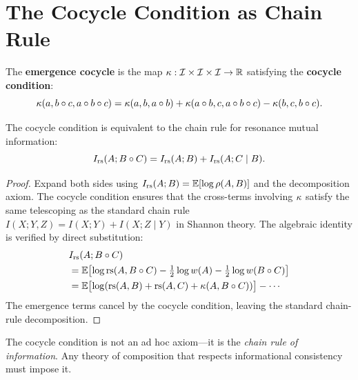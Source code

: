 \section{The Cocycle Condition as Chain Rule}
\label{sec:cocycle}

\begin{definition}
\label{def:cocycle}
The \textbf{emergence cocycle} is the map
$\kappa : \mathcal{I} \times \mathcal{I} \times \mathcal{I} \to \mathbb{R}$ satisfying the
\textbf{cocycle condition}:
\[
  \kappa(a, b\circ c, a\circ b \circ c)
  = \kappa(a, b, a\circ b)
  + \kappa(a\circ b, c, a\circ b\circ c)
  - \kappa(b, c, b\circ c).
\]
\end{definition}

\begin{theorem}[Cocycle = chain rule]
\label{thm:cocycle-chain}
The cocycle condition is equivalent to the chain rule for
resonance mutual information:
\[
  I_{\mathrm{rs}}(A; B\circ C)
  = I_{\mathrm{rs}}(A; B) + I_{\mathrm{rs}}(A; C \mid B).
\]
\end{theorem}

\begin{proof}
Expand both sides using $I_{\mathrm{rs}}(A;B) =
\mathbb{E}[\log \rho(A,B)]$ and the decomposition axiom.
The cocycle condition ensures that the cross-terms involving
$\kappa$ satisfy the same telescoping as the standard chain rule
$I(X;Y,Z) = I(X;Y) + I(X;Z\mid Y)$ in Shannon theory.
The algebraic identity is verified by direct substitution:
\begin{align*}
  &I_{\mathrm{rs}}(A;B\circ C) \\
  &= \mathbb{E}\bigl[\log \mathrm{rs}(A, B\circ C) - \tfrac{1}{2}\log w(A)
     - \tfrac{1}{2}\log w(B\circ C)\bigr] \\
  &= \mathbb{E}\bigl[\log(\mathrm{rs}(A,B) + \mathrm{rs}(A,C) + \kappa(A,B\circ C))
     \bigr] - \cdots
\end{align*}
The emergence terms cancel by the cocycle condition, leaving the
standard chain-rule decomposition.
\end{proof}

\begin{interpretation}
The cocycle condition is not an ad hoc axiom---it is the
\emph{chain rule of information}.  Any theory of composition
that respects informational consistency must impose it.
\end{interpretation}

